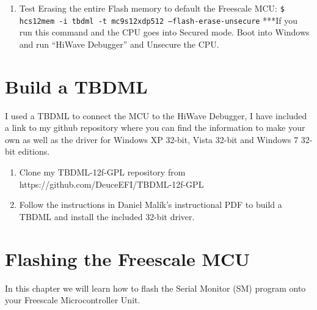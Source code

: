 \documentclass[12pt,notitlepage,onecolumn,oneside,openany]{memoir}
\begin{document}
\begin{enumerate}
\item \textsf{Test Erasing the entire Flash memory to default the Freescale MCU:} \newline
      \texttt{\$ hcs12mem -i tbdml -t mc9s12xdp512 –flash-erase-unsecure} \newline
      \textsf{***If you run this command and the CPU goes into Secured mode.  Boot into Windows and run “HiWave Debugger” and Unsecure the CPU.} 

\end{enumerate}

\chapter{\textsf{Build a TBDML}}

\textsf{I used a TBDML to connect the MCU to the HiWave Debugger, I have included a link to my github repository where you can find the information to make your own as well as the driver for Windows XP 32-bit, Vista 32-bit and Windows 7 32-bit editions.} \newline

\begin{enumerate}
\item \textsf{Clone my TBDML-12f-GPL repository from https://github.com/DeuceEFI/TBDML-12f-GPL}

\item \textsf{Follow the instructions in Daniel Malík's instructional PDF to build a TBDML and install the included 32-bit driver.}
\end{enumerate}

\chapter{\textsf{Flashing the Freescale MCU}}

\textsf{In this chapter we will learn how to flash the Serial Monitor (SM) program onto your Freescale Microcontroller Unit.} \newline
\end{document}
